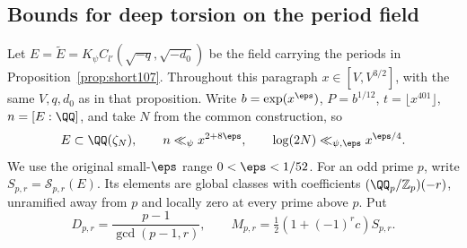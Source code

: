 \documentclass[a4paper,11pt]{article}
\theoremstyle{definition}
\theoremstyle{remark}
\newcommand{\ZZ}{\mathbb Z}\newcommand{\ord}{\operatorname{ord}}
\numberwithin{equation}{section}
\begin{document}
\subsection{Bounds for deep torsion on the period field}\label{nav:II-30}
Let \(E=\widetilde E=K_\psi C_{l'}(\sqrt{-q},\sqrt{-d_0})\) be
the field carrying the periods in Proposition~\ref{prop:short107}.
Throughout this paragraph \(x\in[V,V^{3/2}]\), with the same
\(V,q,d_0\) as in that proposition. Write \(b=\exp(x^\eps)\),
\(P=b^{1/12}\), \(t=\lfloor x^{401}\rfloor\), \(n=[E:\QQ]\),
and take \(N\) from the common construction, so
\[
 E\subset\QQ(\zeta_N),\qquad n\ll_\psi x^{2+8\eps},\qquad
 \log(2N)\ll_{\psi,\eps}x^{\eps/4}.
\]
We use the original small-\(\eps\) range \(0<\eps<1/52\).
For an odd prime \(p\), write \(S_{p,r}=\mathcal S_{p,r}(E)\).
Its elements are global classes with coefficients
\((\QQ_p/\ZZ_p)(-r)\), unramified away from \(p\) and locally
zero at every prime above \(p\). Put
\[
     D_{p,r}=\frac{p-1}{\gcd(p-1,r)},\qquad
     M_{p,r}=\tfrac12(1+(-1)^rc)S_{p,r}.
\]
\end{document}

